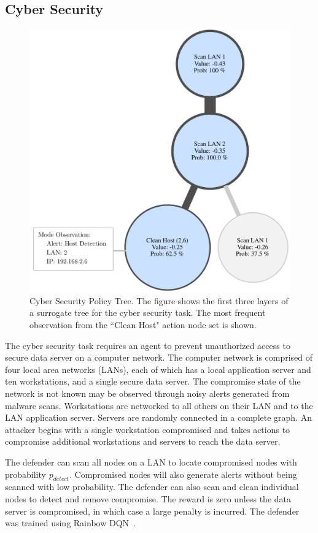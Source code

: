 \documentclass[letterpaper]{article} %
\begin{document}
\subsection{Cyber Security}
\begin{figure}[t]
    \centering
    \includegraphics[width=0.99\columnwidth]{figs/cyber_tree.pdf}
    \caption{Cyber Security Policy Tree. The figure shows the first three layers of a surrogate tree for the cyber security task. The most frequent observation from the ``Clean Host" action node set is shown.}
    \label{fig: cyber tree}
\end{figure}
The cyber security task requires an agent to prevent unauthorized access to secure data server on a computer network.
The computer network is comprised of four local area networks (LANs), each of which has a local application server and ten workstations, and a single secure data server.
The compromise state of the network is not known may be observed through noisy alerts generated from malware scans.
Workstations are networked to all others on their LAN and to the LAN application server.
Servers are randomly connected in a complete graph.
An attacker begins with a single workstation compromised and takes actions to compromise additional workstations and servers to reach the data server.

The defender can scan all nodes on a LAN to locate compromised nodes with probability $p_{detect}$.
Compromised nodes will also generate alerts without being scanned with low probability.
The defender can also scan and clean individual nodes to detect and remove compromise.
The reward is zero unless the data server is compromised, in which case a large penalty is incurred.
The defender was trained using Rainbow DQN~\cite{hessel2018}.
\end{document}
